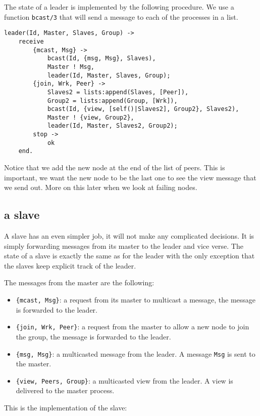 \documentclass[a4paper,11pt]{article}
\begin{document}
The state of a leader is implemented by the following
procedure. We use a function {\tt bcast/3} that will send a message to
each of the processes in a list.

\begin{verbatim}
leader(Id, Master, Slaves, Group) ->    
    receive
        {mcast, Msg} ->
            bcast(Id, {msg, Msg}, Slaves),
            Master ! Msg,
            leader(Id, Master, Slaves, Group);
        {join, Wrk, Peer} ->
            Slaves2 = lists:append(Slaves, [Peer]),         
            Group2 = lists:append(Group, [Wrk]),            
            bcast(Id, {view, [self()|Slaves2], Group2}, Slaves2),
            Master ! {view, Group2},
            leader(Id, Master, Slaves2, Group2);
        stop ->
            ok
    end.
\end{verbatim}

Notice that we add the new node at the end of the list of peers. This
is important, we want the new node to be the last one to see the view
message that we send out. More on this later when we look at failing nodes.

\subsection{a slave}

A slave has an even simpler job, it will not make any complicated
decisions. It is simply forwarding messages from its master to the
leader and vice verse. The state of a slave is exactly the same as for
the leader with the only exception that the slaves keep explicit track of the leader.


The messages from the master are the following:

\begin{itemize}
\item {\tt \{mcast, Msg\}}: a request from its master to multicast a
  message, the message is forwarded to the leader.
\item {\tt \{join, Wrk, Peer\}}: a request from the master to allow a new
  node to join the group, the message is forwarded to the leader.
\item {\tt \{msg, Msg\}}: a multicasted message from the leader. A
  message {\tt  Msg} is sent to the master.
\item {\tt \{view, Peers, Group\}}: a multicasted view from the
  leader. A view is delivered to the master process.
\end{itemize}

This is the implementation of the slave:
\end{document}
